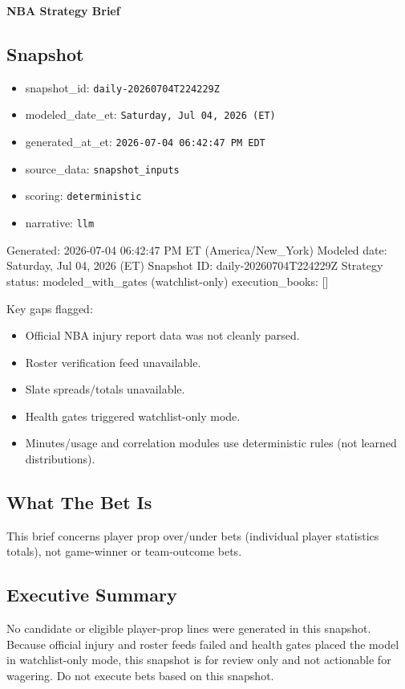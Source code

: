 \documentclass[10pt]{article}
\begin{document}
\begin{center}\LARGE\textbf{NBA Strategy Brief}\end{center}
\vspace{0.5em}
\subsection*{Snapshot}
\begin{itemize}
\item snapshot\_id: \texttt{daily-20260704T224229Z}
\item modeled\_date\_et: \texttt{Saturday, Jul 04, 2026 (ET)}
\item generated\_at\_et: \texttt{2026-07-04 06:42:47 PM EDT}
\item source\_data: \texttt{snapshot\_inputs}
\item scoring: \texttt{deterministic}
\item narrative: \texttt{llm}
\end{itemize}
Generated: 2026-07-04 06:42:47 PM ET (America/New\_York)
Modeled date: Saturday, Jul 04, 2026 (ET)
Snapshot ID: daily-20260704T224229Z
Strategy status: modeled\_with\_gates (watchlist-only)
execution\_books: []

Key gaps flagged:
\begin{itemize}
\item Official NBA injury report data was not cleanly parsed.
\item Roster verification feed unavailable.
\item Slate spreads/totals unavailable.
\item Health gates triggered watchlist-only mode.
\item Minutes/usage and correlation modules use deterministic rules (not learned distributions).
\end{itemize}

\subsection*{What The Bet Is}
This brief concerns player prop over/under bets (individual player statistics totals), not game-winner or team-outcome bets.

\subsection*{Executive Summary}
No candidate or eligible player-prop lines were generated in this snapshot. Because official injury and roster feeds failed and health gates placed the model in watchlist-only mode, this snapshot is for review only and not actionable for wagering. Do not execute bets based on this snapshot.
\end{document}
